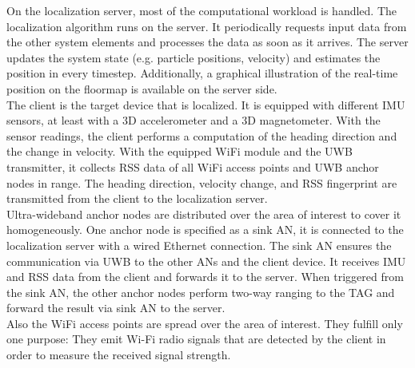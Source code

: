 \noindent\hspace*{5mm}%
On the localization server, most of the computational workload is handled. The localization algorithm runs on the server. It periodically requests input data from the other system elements and processes the data as soon as it arrives. The server updates the system state (e.g. particle positions, velocity) and estimates the position in every timestep. Additionally, a graphical illustration of the real-time position on the floormap is available on the server side. \\
\noindent\hspace*{5mm}%
The client is the target device that is localized. It is equipped with different IMU sensors, at least with a 3D accelerometer and a 3D magnetometer. With the sensor readings, the client performs a computation of the heading direction and the change in velocity. With the equipped WiFi module and the UWB transmitter, it collects RSS data of all WiFi access points and UWB anchor nodes in range. The heading direction, velocity change, and RSS fingerprint are transmitted from the client to the localization server.\\
\noindent\hspace*{5mm}%
Ultra-wideband anchor nodes are distributed over the area of interest to cover it homogeneously. One anchor node is specified as a sink AN, it is connected to the localization server with a wired Ethernet connection. The sink AN ensures the communication via UWB to the other ANs and the client device. It receives IMU and RSS data from the client and forwards it to the server. When triggered from the sink AN, the other anchor nodes perform two-way ranging to the TAG and forward the result via sink AN to the server.\\
\noindent\hspace*{5mm}%
Also the WiFi access points are spread over the area of interest. They fulfill only one purpose: They emit Wi-Fi radio signals that are detected by the client in order to measure the received signal strength. 


